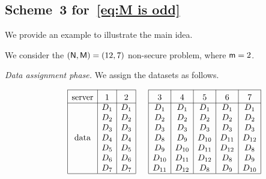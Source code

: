 \documentclass[conference,letterpaper]{IEEEtran}
\begin{document}
\subsection{\texorpdfstring{Scheme~3 for~\eqref{eq:M is odd}}{Scheme 3 for Eq. (Y)}}
\label{sub:M is odd}
We provide an example to illustrate the main idea.
\begin{example} \rm
\label{ex:scheme 3 example}
We consider the $({\sf N}, {\sf M}) = (12, 7)$ non-secure problem, where ${\sf m} = 2$.

{\it Data assignment phase.}
We assign the datasets as follows.  


\begin{align*}
\begin{array}{rl|c|c|c|}\cline{3-3}\cline{4-4}\cline{5-5}
&&\rule{0pt}{1.2em}\mbox{server}&\rule{0pt}{1.2em}\mbox{\textnormal{1}}  &\rule{0pt}{1.2em}\mbox{\textnormal{2}} \\ \cline{3-3}\cline{4-4}\cline{5-5}
&& &D_1 & D_1 \\
&& &D_2 & D_2  \\
&& &D_3 & D_3 \\
&& \mbox{data}&D_4 & D_4  \\
&& &D_5 & D_5 \\
&& &D_6 & D_6 \\
&& &D_7 & D_7\\
\cline{3-3}\cline{4-4}\cline{5-5}
\end{array}
\hspace{-0.5em} %
\begin{array}{rl|c|c|c|c|c|}\cline{3-3}\cline{4-4}\cline{5-5}\cline{6-6}\cline{7-7}
&&\rule{0pt}{1.2em}\mbox{\textnormal{3}} & \rule{0pt}{1.2em}\mbox{\textnormal{4}} & \rule{0pt}{1.2em}\mbox{\textnormal{5}} & \rule{0pt}{1.2em}\mbox{\textnormal{6}} & \rule{0pt}{1.2em}\mbox{\textnormal{7}} \\ \cline{3-3}\cline{4-4}\cline{5-5}\cline{6-6}\cline{7-7}
&&  D_1 & D_1 & D_1 & D_1 & D_1\\
&&   D_2 & D_2 & D_2 & D_2 & D_2 \\
&&  D_3 & D_3 & D_3 & D_3 & D_3\\
&&  D_8 & D_9 & D_{10} & D_{11} & D_{12} \\
&&  D_9 & D_{10} & D_{11} & D_{12} & D_8\\
&&  D_{10} & D_{11} & D_{12} & D_8 & D_9\\
&&  D_{11} & D_{12} & D_8 & D_9 & D_{10}\\
\cline{3-3}\cline{4-4}\cline{5-5}\cline{6-6}\cline{7-7}
\end{array}
\end{align*}



\end{example}
\end{document}

